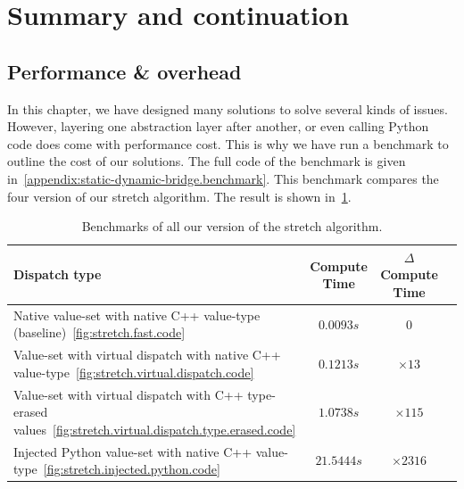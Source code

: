 \section{Summary and continuation}

\subsection{Performance \& overhead}

In this chapter, we have designed many solutions to solve several kinds of issues. However, layering one abstraction
layer after another, or even calling Python code does come with performance cost. This is why we have run a benchmark to
outline the cost of our solutions. The full code of the benchmark is given
in~\cref{appendix:static-dynamic-bridge.benchmark}. This benchmark compares the four version of our stretch algorithm.
The result is shown in~\cref{table:static.dynamic.perfs}.


\begin{table}[htbp]
  \footnotesize
  \centering
  \begin{tabular}{l|ccc}
    \toprule
    Dispatch type                                                                                                   &
    Compute Time                                                                                                    &
    \(\Delta{}\)Compute Time
    \\ \midrule Native value-set with native C++ value-type (baseline)~\ref{fig:stretch.fast.code}
                                                                                                                    & \(0.0093s\) & \(0\) \\
    Value-set with virtual dispatch with native C++ value-type~\ref{fig:stretch.virtual.dispatch.code}              &
    \(0.1213s\)                                                                                                     &
    \(\times 13\)
    \\
    Value-set with virtual dispatch with C++ type-erased values~\ref{fig:stretch.virtual.dispatch.type.erased.code} &
    \(1.0738s\)                                                                                                     &
    \(\times 115\)
    \\
    Injected Python value-set with native C++ value-type~\ref{fig:stretch.injected.python.code}                     &
    \(21.5444s\)                                                                                                    &
    \(\times 2316\)
    \\
    \bottomrule
  \end{tabular}
  \caption{Benchmarks of all our version of the stretch algorithm.}
  \label{table:static.dynamic.perfs}
\end{table}

